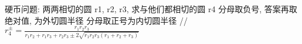 硬币问题: 两两相切的圆 r1, r2, r3, 求与他们都相切的圆 r4
分母取负号, 答案再取绝对值, 为外切圆半径
分母取正号为内切圆半径
// $ r^{\pm}_4 = \frac{r_1 r_2 r_3}{r_1 r_2 + r_1 r_3 + r_2 r_3 \pm 2\sqrt{r_1r_2r_3(r_1 + r_2 + r_3)}} $
